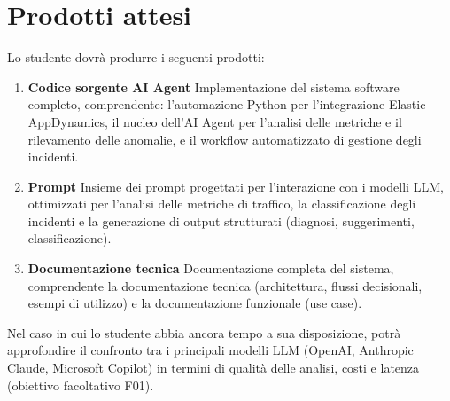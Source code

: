 \section*{Prodotti attesi}
Lo studente dovrà produrre i seguenti prodotti:
\begin{enumerate}
    \item \textbf{Codice sorgente AI Agent} \newline
    Implementazione del sistema software completo, comprendente: l'automazione Python per l'integrazione Elastic-AppDynamics, il nucleo dell'AI Agent per l'analisi delle metriche e il rilevamento delle anomalie, e il workflow automatizzato di gestione degli incidenti.

    \item \textbf{Prompt} \newline
    Insieme dei prompt progettati per l'interazione con i modelli LLM, ottimizzati per l'analisi delle metriche di traffico, la classificazione degli incidenti e la generazione di output strutturati (diagnosi, suggerimenti, classificazione).

    \item \textbf{Documentazione tecnica} \newline
    Documentazione completa del sistema, comprendente la documentazione tecnica (architettura, flussi decisionali, esempi di utilizzo) e la documentazione funzionale (use case).
\end{enumerate}

Nel caso in cui lo studente abbia ancora tempo a sua disposizione, potrà approfondire il confronto tra i principali modelli LLM (OpenAI, Anthropic Claude, Microsoft Copilot) in termini di qualità delle analisi, costi e latenza (obiettivo facoltativo F01).
